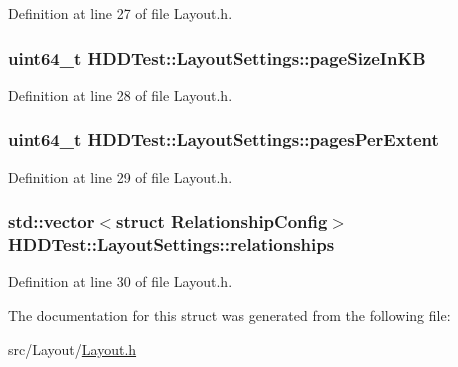 Definition at line 27 of file Layout.\-h.

\hypertarget{struct_h_d_d_test_1_1_layout_settings_ac0a3416abc480fde8b194b02cbfcad25}{
\subsubsection[{page\-Size\-In\-K\-B}]{\setlength{\rightskip}{0pt plus 5cm}uint64\-\_\-t H\-D\-D\-Test\-::\-Layout\-Settings\-::page\-Size\-In\-K\-B}}\label{struct_h_d_d_test_1_1_layout_settings_ac0a3416abc480fde8b194b02cbfcad25}


Definition at line 28 of file Layout.\-h.

\hypertarget{struct_h_d_d_test_1_1_layout_settings_aea0e0ec07c3ddc2dd198345689f6899e}{
\subsubsection[{pages\-Per\-Extent}]{\setlength{\rightskip}{0pt plus 5cm}uint64\-\_\-t H\-D\-D\-Test\-::\-Layout\-Settings\-::pages\-Per\-Extent}}\label{struct_h_d_d_test_1_1_layout_settings_aea0e0ec07c3ddc2dd198345689f6899e}


Definition at line 29 of file Layout.\-h.

\hypertarget{struct_h_d_d_test_1_1_layout_settings_a9d2aea674708a168136bd3aba5a27be9}{
\subsubsection[{relationships}]{\setlength{\rightskip}{0pt plus 5cm}std\-::vector$<$struct {\bf Relationship\-Config}$>$ H\-D\-D\-Test\-::\-Layout\-Settings\-::relationships}}\label{struct_h_d_d_test_1_1_layout_settings_a9d2aea674708a168136bd3aba5a27be9}


Definition at line 30 of file Layout.\-h.



The documentation for this struct was generated from the following file\-:\begin{DoxyCompactItemize}
\item 
src/\-Layout/\hyperlink{_layout_8h}{Layout.\-h}\end{DoxyCompactItemize}
